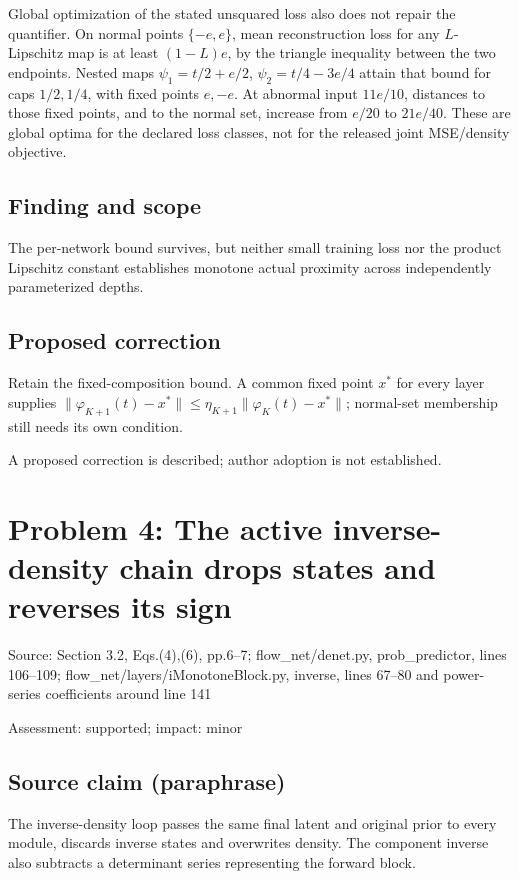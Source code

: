\documentclass[11pt]{article}
\begin{document}
Global optimization of the stated unsquared loss also does not repair the quantifier. On normal points \(\{-e,e\}\), mean reconstruction loss for any \(L\)-Lipschitz map is at least \((1-L)e\), by the triangle inequality between the two endpoints. Nested maps \(\psi_1=t/2+e/2\), \(\psi_2=t/4-3e/4\) attain that bound for caps \(1/2,1/4\), with fixed points \(e,-e\). At abnormal input \(11e/10\), distances to those fixed points, and to the normal set, increase from \(e/20\) to \(21e/40\). These are global optima for the declared loss classes, not for the released joint MSE/density objective.

\subsection*{Finding and scope}

The per-network bound survives, but neither small training loss nor the product Lipschitz constant establishes monotone actual proximity across independently parameterized depths.

\subsection*{Proposed correction}

Retain the fixed-composition bound. A common fixed point \(x^*\) for every layer supplies \(\|\varphi_{K+1}(t)-x^*\|\le\eta_{K+1}\|\varphi_K(t)-x^*\|\); normal-set membership still needs its own condition.

A proposed correction is described; author adoption is not established.

\section*{Problem 4: The active inverse-density chain drops states and reverses its sign}

Source: Section 3.2, Eqs.(4),(6), pp.6–7; flow\_net/denet.py, prob\_predictor, lines 106–109; flow\_net/layers/iMonotoneBlock.py, inverse, lines 67–80 and power-series coefficients around line 141

Assessment: supported; impact: minor

\subsection*{Source claim (paraphrase)}

The inverse-density loop passes the same final latent and original prior to every module, discards inverse states and overwrites density. The component inverse also subtracts a determinant series representing the forward block.
\end{document}
